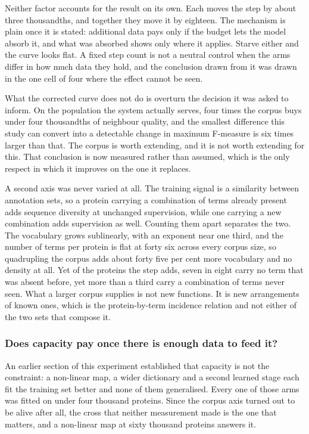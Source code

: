 Neither factor accounts for the result on its own. Each moves the step by about three
thousandths, and together they move it by eighteen. The mechanism is plain once it is
stated: additional data pays only if the budget lets the model absorb it, and what was
absorbed shows only where it applies. Starve either and the curve looks flat. A fixed
step count is not a neutral control when the arms differ in how much data they hold,
and the conclusion drawn from it was drawn in the one cell of four where the effect
cannot be seen.

What the corrected curve does not do is overturn the decision it was asked to inform.
On the population the system actually serves, four times the corpus buys under four
thousandths of neighbour quality, and the smallest difference this study can convert
into a detectable change in maximum F-measure is six times larger than that. The
corpus is worth extending, and it is not worth extending for this. That conclusion is
now measured rather than assumed, which is the only respect in which it improves on
the one it replaces.

A second axis was never varied at all. The training signal is a similarity between
annotation sets, so a protein carrying a combination of terms already present adds
sequence diversity at unchanged supervision, while one carrying a new combination adds
supervision as well. Counting them apart separates the two. The vocabulary grows
sublinearly, with an exponent near one third, and the number of terms per protein is
flat at forty six across every corpus size, so quadrupling the corpus adds about forty
five per cent more vocabulary and no density at all. Yet of the proteins the step adds,
seven in eight carry no term that was absent before, yet more than a third carry a
combination of terms never seen. What a larger corpus supplies is not new functions. It
is new arrangements of known ones, which is the protein-by-term incidence relation and
not either of the two sets that compose it.

\subsubsection{Does capacity pay once there is enough data to feed it?}

An earlier section of this experiment established that capacity is not the constraint:
a non-linear map, a wider dictionary and a second learned stage each fit the training
set better and none of them generalised. Every one of those arms was fitted on under
four thousand proteins. Since the corpus axis turned out to be alive after all, the
cross that neither measurement made is the one that matters, and a non-linear map at
sixty thousand proteins answers it.


